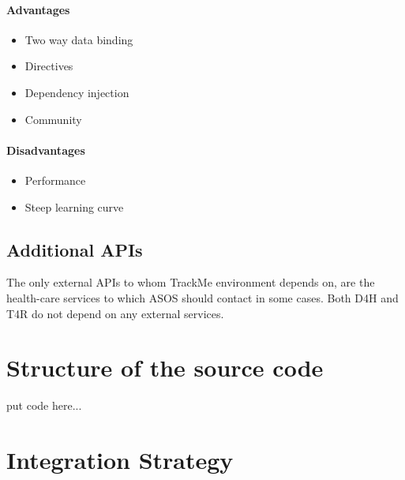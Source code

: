 \documentclass[a4paper, hidelinks, 12pt]{report}
\begin{document}
\subsubsection{Advantages}
\begin{itemize}
\item{} Two way data binding
\item{} Directives
\item{} Dependency injection
\item{} Community
\end{itemize}
\subsubsection{Disadvantages}
\begin{itemize}
\item{} Performance
\item{} Steep learning curve

\end{itemize}

	






	\section{Additional APIs}
The only external APIs to whom TrackMe environment depends on, are the health-care services to which ASOS should contact in some cases. Both D4H and T4R do not depend on any external services.


\chapter{Structure of the source code}
put code here...		


	\chapter{Integration Strategy}
\end{document}
